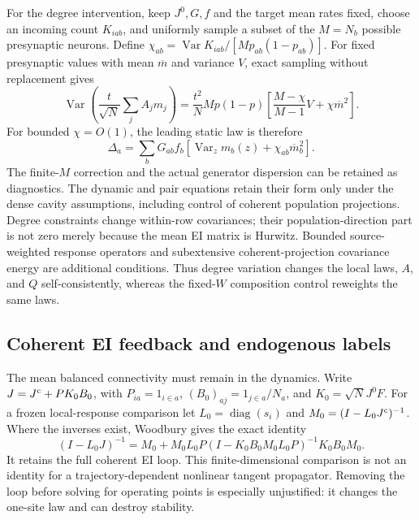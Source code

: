 For the degree intervention, keep $J^0,G,f$ and the target mean rates fixed,
choose an incoming count $K_{iab}$, and uniformly sample a subset of the
$M=N_b$ possible presynaptic neurons. Define
$\chi_{ab}=\operatorname{Var}K_{iab}/[Mp_{ab}(1-p_{ab})]$.
For fixed presynaptic values with mean $\overline m$ and variance $V$, exact
sampling without replacement gives
\begin{equation}
 \operatorname{Var}\!\left(\frac{t}{\sqrt N}\sum_jA_jm_j\right)
 =\frac{t^2}{N}Mp(1-p)
     \left[\frac{M-\chi}{M-1}V+\chi\overline m^2\right].
 \label{eq:an_finite_degree}
\end{equation}
For bounded $\chi=O(1)$, the leading static law is therefore
\begin{equation}
 \Delta_a=\sum_bG_{ab}f_b
  \left[\operatorname{Var}_z m_b(z)+\chi_{ab}\overline m_b^2\right].
 \label{eq:an_degree_static}
\end{equation}
The finite-$M$ correction and the actual generator dispersion can be retained
as diagnostics. The dynamic and pair equations retain their form only under
the dense cavity assumptions, including control of coherent population
projections. Degree constraints change within-row covariances; their
population-direction part is not zero merely because the mean EI matrix is
Hurwitz. Bounded source-weighted response operators and subextensive
coherent-projection covariance energy are additional conditions. Thus degree
variation changes the local laws, $A$, and $Q$ self-consistently, whereas the
fixed-$W$ composition control reweights the same laws.

\subsection{Coherent EI feedback and endogenous labels}

The mean balanced connectivity must remain in the dynamics. Write
$J=J^{\rm c}+P K_0 B_0$, with $P_{ia}=1_{i\in a}$,
$(B_0)_{aj}=1_{j\in a}/N_a$, and $K_0=\sqrt N J^0F$.
For a frozen local-response comparison let
$L_0=\operatorname{diag}(s_i)$ and $M_0=(I-L_0J^{\rm c})^{-1}$.
Where the inverses exist, Woodbury gives the exact identity
\begin{equation}
 (I-L_0J)^{-1}=M_0+
 M_0L_0P(I-K_0B_0M_0L_0P)^{-1}K_0B_0M_0.
 \label{eq:an_coherent}
\end{equation}
It retains the full coherent EI loop. This finite-dimensional comparison is
not an identity for a trajectory-dependent nonlinear tangent propagator.
Removing the loop before solving for operating points is especially
unjustified: it changes the one-site law and can destroy stability.


